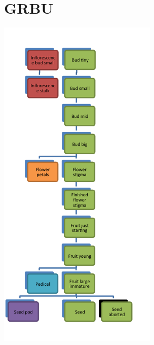 \documentclass[10pt]{book} %
\begin{document}
\clearpage
\newpage


\section{GRBU}
\begin{multicols}{2}
\includegraphics[width=3in]{images/GRBU.png}
\vfill
\columnbreak

\\

\end{multicols}

\clearpage
\newpage
\end{document}
